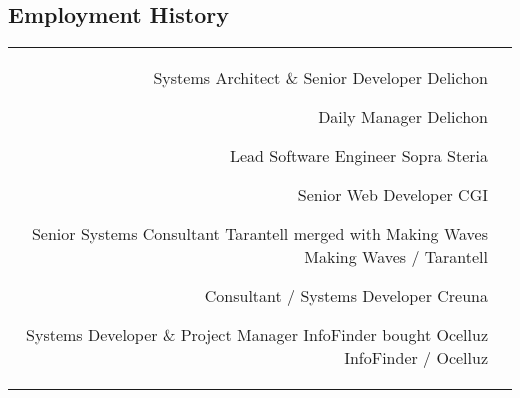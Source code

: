 \documentclass[10pt]{article} %
\begin{document}
\begin{paracol}{2}
\section{Employment History} 





\begin{supertabular}{rl} %

	{Systems Architect \& Senior Developer} %
	{} %
	{} %
	{Delichon} %

	{Daily Manager} %
	{} %
	{} %
	{Delichon} %

	{Lead Software Engineer} %
	{} %
	{} %
	{Sopra Steria} %
	
	
	{Senior Web Developer} %
	{} %
	{} %
	{CGI} %
	

	{Senior Systems Consultant} %
	{Tarantell merged with Making Waves} %
	{} %
	{Making Waves / Tarantell} %
	
	{Consultant / Systems Developer} %
	{} %
	{} %
	{Creuna} %
	

	{Systems Developer \& Project Manager} %
	{InfoFinder bought Ocelluz} %
	{} %
	{InfoFinder / Ocelluz} %
	

\end{supertabular}
\end{paracol}
\end{document}
